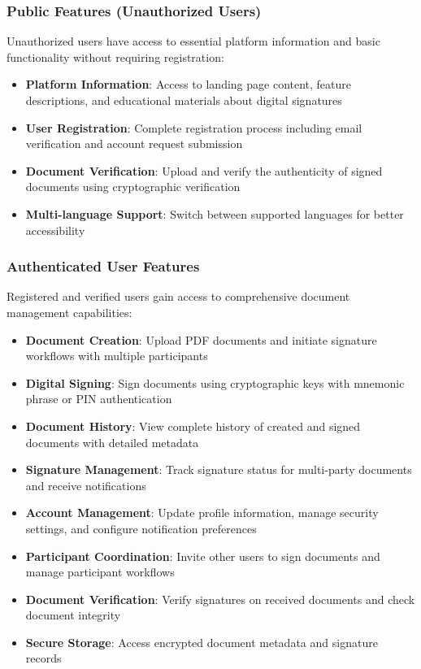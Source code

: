 \subsubsection{Public Features (Unauthorized Users)}
Unauthorized users have access to essential platform information and basic functionality without requiring registration:

\begin{itemize}
    \item \textbf{Platform Information}: Access to landing page content, feature descriptions, and educational materials about digital signatures
    \item \textbf{User Registration}: Complete registration process including email verification and account request submission
    \item \textbf{Document Verification}: Upload and verify the authenticity of signed documents using cryptographic verification
    \item \textbf{Multi-language Support}: Switch between supported languages for better accessibility
\end{itemize}

\subsubsection{Authenticated User Features}
Registered and verified users gain access to comprehensive document management capabilities:

\begin{itemize}
    \item \textbf{Document Creation}: Upload PDF documents and initiate signature workflows with multiple participants
    \item \textbf{Digital Signing}: Sign documents using cryptographic keys with mnemonic phrase or PIN authentication
    \item \textbf{Document History}: View complete history of created and signed documents with detailed metadata
    \item \textbf{Signature Management}: Track signature status for multi-party documents and receive notifications
    \item \textbf{Account Management}: Update profile information, manage security settings, and configure notification preferences
    \item \textbf{Participant Coordination}: Invite other users to sign documents and manage participant workflows
    \item \textbf{Document Verification}: Verify signatures on received documents and check document integrity
    \item \textbf{Secure Storage}: Access encrypted document metadata and signature records
\end{itemize}

